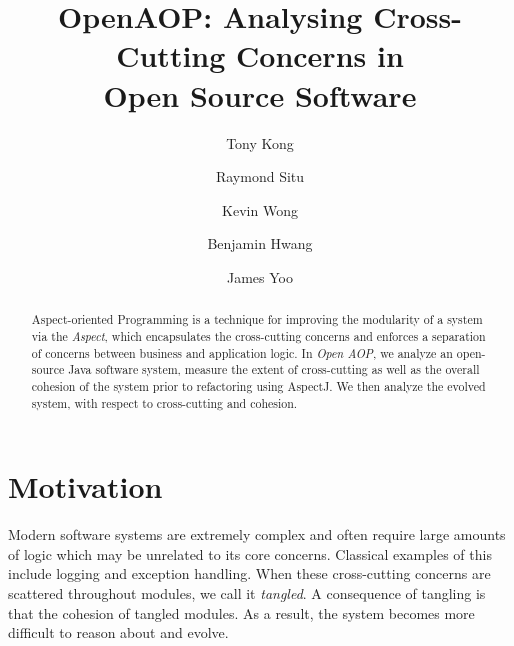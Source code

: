 \documentclass[sigconf]{acmart}
\begin{document}
\title{OpenAOP: Analysing Cross-Cutting Concerns in \protect\\ Open Source Software}

\author{Tony Kong}

\author{Raymond Situ}

\author{Kevin Wong}

\author{Benjamin Hwang}

\author{James Yoo}

\begin{abstract}
Aspect-oriented Programming is a technique for improving the modularity of a system via the \textit{Aspect}, which encapsulates the cross-cutting concerns and enforces a separation of concerns between business and application logic. In \textit{Open AOP}, we analyze an open-source Java software system, measure the extent of cross-cutting as well as the overall cohesion of the system prior to refactoring using AspectJ. We then analyze the evolved system, with respect to cross-cutting and cohesion.
\end{abstract}

\maketitle

\section{Motivation}
Modern software systems are extremely complex and often require large amounts of logic which may be unrelated to its core concerns. Classical examples of this include logging and exception handling. When these cross-cutting concerns are scattered throughout modules, we call it \textit{tangled}. A consequence of tangling is that the cohesion of tangled modules. As a result, the system becomes more difficult to reason about and evolve.
\end{document}
